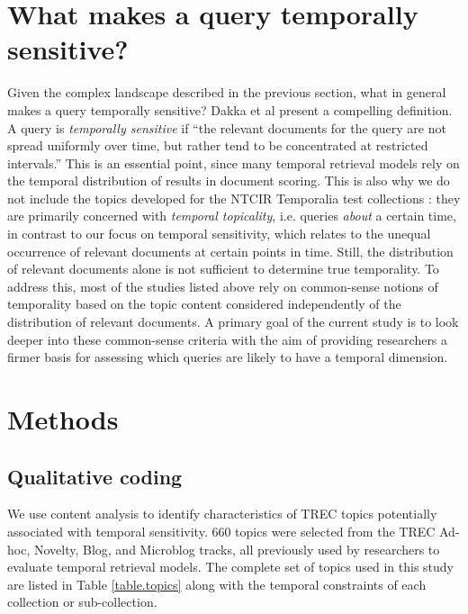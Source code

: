 \documentclass{sig-alternate-05-2015}
\begin{document}
\section{What makes a query temporally sensitive?}

Given the complex landscape described in the previous section, what in general makes a query temporally sensitive? Dakka et al \cite{Dakka2012} present a compelling definition. A query is \emph{temporally sensitive}  if  ``the relevant documents for the query are not spread uniformly over time, but rather tend to be concentrated at restricted intervals.'' This is an essential point, since many temporal retrieval models rely on the temporal distribution of results in document scoring. This is also why we do not include the topics developed for the NTCIR Temporalia test collections \cite{Joho2014b}: they are primarily concerned with \emph{temporal topicality}, i.e. queries \emph{about} a certain time, in contrast to our focus on temporal sensitivity, which relates to the unequal occurrence of relevant documents at certain points in time. Still, the distribution of relevant documents alone is not sufficient to determine true temporality. To address this, most of the studies listed above rely on common-sense notions of temporality based on the topic content considered independently of the distribution of relevant documents. A primary goal of the current study is to look deeper into these common-sense criteria with the aim of providing researchers a firmer basis for assessing which queries are likely to have a temporal  dimension.


\section{Methods}
\vspace{-1em}
\subsection{Qualitative coding}
We use content analysis \cite{Krippendorff1980} to identify characteristics of TREC topics potentially associated with temporal sensitivity. 660 topics were selected from the TREC Ad-hoc, Novelty, Blog, and Microblog tracks, all previously used by researchers to evaluate temporal retrieval models. The complete set of topics used in this study are listed in Table \ref{table.topics} along with the temporal constraints of each collection or sub-collection.
\end{document}
